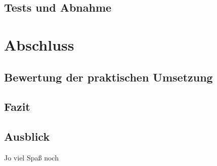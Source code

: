 \subsection{Tests und Abnahme}
\label{s:qs:tests}

\newpage
\section{Abschluss}
\label{s:closing}
\subsection{Bewertung der praktischen Umsetzung}
\label{s:closing:rating}
\subsection{Fazit}
\label{s:closing:conclusion}
\subsection{Ausblick}
\label{s:closing:outlook}
 Jo viel Spaß noch
